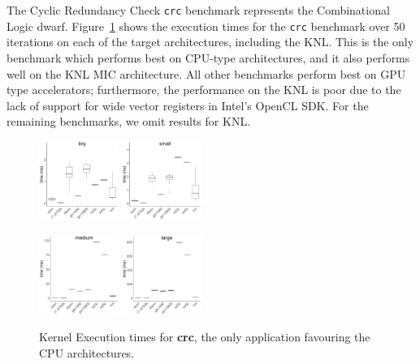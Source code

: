 \documentclass[../document.tex]{subfiles}
\begin{document}
\label{ssec:time}
	
The Cyclic Redundancy Check {\tt crc} benchmark represents the Combinational Logic dwarf.
Figure~\ref{fig:time-crc} shows the execution times for the {\tt crc} benchmark over 50 iterations on each of the target architectures, including the KNL.
This is the only benchmark which performs best on CPU-type architectures, and it also performs well on the KNL MIC architecture.
All other benchmarks perform best on GPU type accelerators; furthermore, the performance on the KNL is poor due to the lack of support for wide vector registers in Intel's OpenCL SDK.
For the remaining benchmarks, we omit results for KNL.

\begin{figure}[h]
	\centering
	\includegraphics[width=0.23\textwidth]{figures/time-results/generate_crc_tiny_boxplot_knl-1}
	\includegraphics[width=0.23\textwidth]{figures/time-results/generate_crc_small_boxplot_knl-1}
	
	\includegraphics[width=0.23\textwidth]{figures/time-results/generate_crc_medium_boxplot_knl-1}
	\includegraphics[width=0.23\textwidth]{figures/time-results/generate_crc_large_boxplot_knl-1}
	\caption{Kernel Execution times for {\bf crc}, the only application favouring the CPU architectures.}
	\label{fig:time-crc}
\end{figure}
\end{document}
